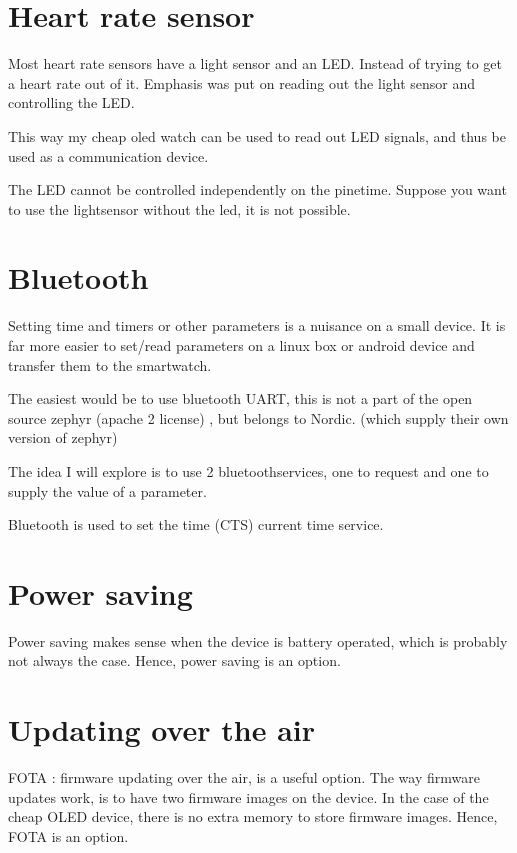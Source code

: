 \documentclass[letterpaper,10pt,english]{sphinxmanual}
\begin{document}
\section{Heart rate sensor}
\label{\detokenize{idea:heart-rate-sensor}}
Most heart rate sensors have a light sensor and an LED.
Instead of trying to get a heart rate out of it.
Emphasis was put on reading out the light sensor and controlling the LED.

This way my cheap oled watch can be used to read out LED signals, and thus be used as a communication device.

The LED cannot be controlled independently on the pinetime. Suppose you want to use the lightsensor without the led, it is not possible.


\section{Bluetooth}
\label{\detokenize{idea:bluetooth}}
Setting time and timers or other parameters is a nuisance on a small device. It is far more easier to set/read parameters on a linux box or android device and transfer them to the smartwatch.

The easiest would be to use bluetooth UART, this is not a part of the open source zephyr (apache 2 license) , but belongs to Nordic. (which supply their own version of zephyr)

The idea I will explore is to use 2 bluetoothservices, one to request and one to supply the value of a parameter.

Bluetooth is used to set the time (CTS) current time service.


\section{Power saving}
\label{\detokenize{idea:power-saving}}
Power saving makes sense when the device is battery operated, which is probably not always the case.
Hence, power saving is an option.


\section{Updating over the air}
\label{\detokenize{idea:updating-over-the-air}}
FOTA : firmware updating over the air, is a useful option.
The way firmware updates work, is to have two firmware images on the device.
In the case of the cheap OLED device, there is no extra memory to store firmware images.
Hence, FOTA is an option.
\end{document}
